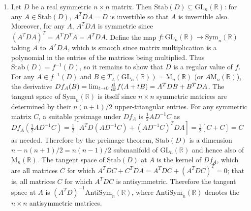 \documentclass[11pt,leqno]{article}
\theoremstyle{plain}
\theoremstyle{definition}
\numberwithin{equation}{section}
\numberwithin{lem}{section}
\newcommand{\GL}{\mathrm{GL}}
\newcommand{\Mat}{\mathrm{M}}
\newcommand{\AS}{\mathrm{AntiSym}}
\newcommand{\Sym}{\mathrm{Sym}}
\newcommand{\Stab}{\mathrm{Stab}}
\begin{document}
\begin{enumerate}
    \item Let $D$ be a real symmetric $n\times n$ matrix. Then $\Stab(D)\subseteq \GL_n(\mathbb R)$: for any $A\in \Stab(D)$, $A^TDA = D$ is invertible so that $A$ is invertible also. Moreover, for any $A$, $A^TDA$ is symmetric since $(A^TDA)^T = A^TD^TA = A^TDA$. Define the map $f\colon \GL_n(\mathbb R)\to \Sym_n(\mathbb R)$ taking $A$ to $A^TDA$, which is smooth since matrix multiplication is a polynomial in the entries of the matrices being multiplied. Thus $\Stab(D) = f^{-1}(D)$, so it remains to show that $D$ is a regular value of $f$. For any $A\in f^{-1}(D)$ and $B\in T_A(\GL_n(\mathbb R)) = \Mat_n(\mathbb R)$ (or $A\Mat_n(\mathbb R)$), the derivative $Df_A(B) = \lim_{t\to 0}\dv{t}f(A+tB) = A^TDB + B^TDA$. The tangent space of $\Sym_n(\mathbb R)$ is itself since $n\times n$ symmetric matrices are determined by their $n(n+1)/2$ upper-triangular entries. For any symmetric matrix $C$, a suitable preimage under $Df_A$ is $\frac{1}{2}AD^{-1}C$ as $Df_A(\frac{1}{2}AD^{-1}C) = \frac{1}{2}[A^TD(AD^{-1}C) + (AD^{-1}C)^TDA] = \frac{1}{2}[C + C] = C$ as needed. Therefore by the preimage theorem, $\Stab(D)$ is a dimension $n - n(n+1)/2 = n(n-1)/2$ submanifold of $\GL_n(\mathbb R)$ and hence also of $\Mat_n(\mathbb R)$. The tangent space of $\Stab(D)$ at $A$ is the kernel of $Df_A$, which are all matrices $C$ for which $A^TDC + C^TDA = A^TDC + (A^TDC)^T = 0$; that is, all matrices $C$ for which $A^TDC$ is antisymmetric. Therefore the tangent space at $A$ is $(A^TD)^{-1}\AS_n(\mathbb R)$, where $\AS_n(\mathbb R)$ denotes the $n\times n$ antisymmetric matrices.
    

\end{enumerate}
\end{document}
